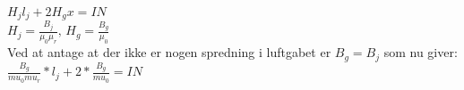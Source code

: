 $H_{j}l_{j}+2H_{g}x=IN$ \\

$H_{j}=\frac{B_{j}}{\mu_{0}\mu_{r}},\,H_{g}=\frac{B_{g}
}{\mu_{0}}$\\

Ved at antage at der ikke er nogen spredning i luftgabet er $B_{g}=B_{j}$ som nu giver:\\

$\frac{B_{g}}{mu_{0}mu_{r}}*l_{j}+2*\frac{B_{g}}{mu_{0}}=IN$\\



 
